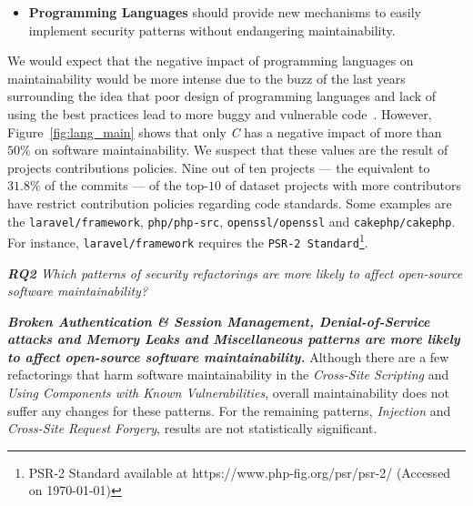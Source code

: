 \documentclass[10pt,conference]{IEEEtran}
\begin{document}
{\begin{itemize}
	\item\textbf{Programming Languages} should provide new mechanisms to easily
	implement security patterns without endangering maintainability.
\end{itemize}

We would expect that the negative impact of programming languages on
maintainability would be more intense due to the buzz of the last years
surrounding the idea that poor design of programming languages and lack of using
the best practices lead to more buggy and vulnerable
code~\cite{Ray:2017:LSP:3144574.3126905, 2019arXiv190110220B}. However,
Figure~\ref{fig:lang_main} shows that only \emph{C} has a negative impact of
more than $50\%$ on software maintainability. We suspect that these values are
the result of projects contributions policies. Nine out of ten projects --- the
equivalent to $31.8\%$ of the commits --- of the top-$10$ of dataset projects
with more contributors have restrict contribution policies regarding code
standards. Some examples are the \texttt{laravel/framework},
\texttt{php/php-src}, \texttt{openssl/openssl} and \texttt{cakephp/cakephp}. For
instance, \texttt{laravel/framework} requires the \texttt{PSR-2
Standard}\footnote{PSR-2 Standard available at
https://www.php-fig.org/psr/psr-2/ (Accessed on \today{})}.

\begin{framed}
\textit{\textbf{RQ2} Which patterns of security refactorings are more likely to
affect open-source software maintainability?}
\end{framed}

\textbf{\textit{Broken Authentication \& Session Management, Denial-of-Service
attacks and Memory Leaks and Miscellaneous patterns are more likely to affect
open-source software maintainability.}} Although there are a few refactorings
that harm software maintainability in the \emph{Cross-Site Scripting} and
\emph{Using Components with Known Vulnerabilities}, overall maintainability does
not suffer any changes for these patterns. For the remaining patterns,
\emph{Injection} and \emph{Cross-Site Request Forgery}, results are not
statistically significant.

}
\end{document}
